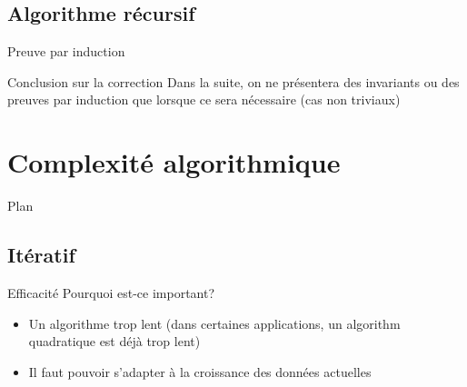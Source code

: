 


\subsection{Algorithme récursif}

\begin{frame}{Preuve par induction}

\end{frame}

\begin{frame}{Conclusion sur la correction}
Dans la suite, on ne présentera des invariants ou des preuves par induction que lorsque ce sera nécessaire (cas non triviaux)
\end{frame}

\section{Complexité algorithmique}

\begin{frame}{Plan}

\tableofcontents

\end{frame}

\subsection{Itératif}

\begin{frame}{Efficacité}
Pourquoi est-ce important?
\begin{itemize}
\item Un algorithme trop lent (dans certaines applications, un algorithm quadratique est déjà trop lent)
\item Il faut pouvoir s'adapter à la croissance des données actuelles
\end{itemize}

\end{frame}



